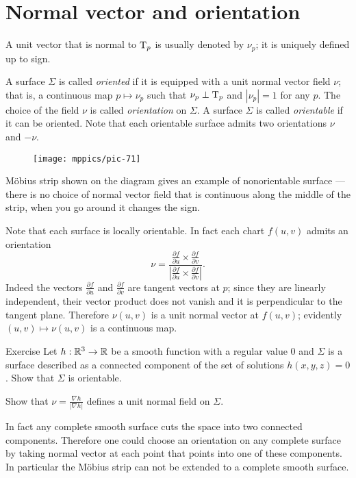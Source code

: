 \section*{Normal vector and orientation}
A unit vector that is normal to $\mathrm{T}_p$ is usually denoted by $\nu_p$;
it is uniquely defined up to sign.

A surface $\Sigma$ is called \emph{oriented} if it is equipped with a unit normal vector field $\nu$;
that is, a continuous map $p\mapsto \nu_p$ such that $\nu_p\perp\mathrm{T}_p$ and $|\nu_p|=1$ for any $p$.
The choice of the field $\nu$ is called \emph{orientation} on $\Sigma$.
A surface $\Sigma$ is called \emph{orientable} if it can be oriented.
Note that each orientable surface admits two orientations $\nu$ and $-\nu$. %

\begin{wrapfigure}{o}{40 mm}
\vskip-0mm
\centering
\texttt{[image: mppics/pic-71]}
\vskip0mm
\end{wrapfigure}

M\"obius strip shown on the diagram gives an example of nonorientable surface --- there is no choice of normal vector field that is continuous along the middle of the strip, 
when you go around it changes the sign.

Note that each surface is locally orientable.
In fact each chart $f(u,v)$ admits an orientation 
\[\nu=
\frac{\tfrac{\partial f}{\partial u}\times \tfrac{\partial f}{\partial v}}
{\left|\tfrac{\partial f}{\partial u}\times \tfrac{\partial f}{\partial v}\right|}.\]
Indeed the vectors $\tfrac{\partial f}{\partial u}$ and $\tfrac{\partial f}{\partial v}$ are tangent vectors at $p$; 
since they are linearly independent, their vector product does not vanish and it is perpendicular to the tangent plane.
Therefore $\nu(u,v)$ is a unit normal vector at $f(u,v)$;
evidently $(u,v)\mapsto \nu(u,v)$ is a continuous map. 

\begin{thm}{Exercise}
Let $h:\mathbb{R}^3\to\mathbb{R}$ be a smooth function with a regular value $0$ and $\Sigma$ is a surface described as a connected component of the set of solutions $h(x,y,z)=0$.
Show that $\Sigma$ is orientable.
\end{thm}

 Show that $\nu=\tfrac{\nabla h}{|\nabla h|}$ defines a unit normal field on $\Sigma$.


In fact any complete smooth surface cuts the space into two connected components.
Therefore one could choose an orientation on any complete surface by taking normal vector at each point that points into one of these components. %
In particular the M\"obius strip can not be extended to a complete smooth surface. %

